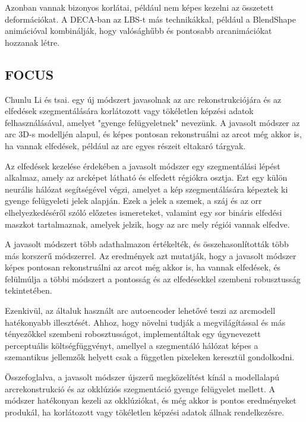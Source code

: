 \documentclass[12pt,a4]{article}
\begin{document}
                Azonban vannak bizonyos korlátai, például nem képes kezelni az összetett deformációkat. A DECA-ban az LBS-t más technikákkal, például a 
                BlendShape animációval kombinálják, hogy valósághűbb és pontosabb arcanimációkat hozzanak létre.

        \subsection{FOCUS}

            \cite{focus}Chunlu Li és tsai. egy új módszert javasolnak az arc rekonstrukciójára és az elfedések szegmentálására korlátozott vagy tökéletlen képzési adatok felhasználásával, amelyet "gyenge felügyeletnek" nevezünk. A javasolt módszer az arc 3D-s modelljén alapul, és képes pontosan rekonstruálni az arcot még akkor is, ha vannak elfedések, például az arc egyes részeit eltakaró tárgyak.
    
            Az elfedések kezelése érdekében a javasolt módszer egy szegmentálási lépést alkalmaz, amely az arcképet látható és elfedett régiókra osztja. Ezt egy külön neurális hálózat segítségével végzi, amelyet a kép szegmentálására képeztek ki gyenge felügyeleti jelek alapján. Ezek a jelek a szemek, a száj és az orr elhelyezkedéséről szóló előzetes ismereteket, valamint egy sor bináris elfedési maszkot tartalmaznak, amelyek jelzik, hogy az arc mely régiói vannak elfedve.
    
            A javasolt módszert több adathalmazon értékelték, és összehasonlították több más korszerű módszerrel. Az eredmények azt mutatják, hogy a javasolt módszer képes pontosan rekonstruálni az arcot még akkor is, ha vannak elfedések, és felülmúlja a többi módszert a pontosság és az elfedésekkel szembeni robusztusság tekintetében.
    
            Ezenkivül, az általuk használt arc autoencoder lehetővé teszi az arcmodell hatékonyabb illesztését. Ahhoz, hogy növelni tudják a megvilágítással és
     	      más tényezőkkel szembeni robosztusságot, implementáltak egy úgynevezett
     	      perceptuális költségfüggvényt, amellyel a szegmentáló hálózat képes a 
            szemantikus jellemzők helyett csak a független pixeleken keresztül gondolkodni.
    
            Összefoglalva, a javasolt módszer újszerű megközelítést kínál a modellalapú arcrekonstrukció és az okklúziós szegmentáció gyenge felügyelet mellett. A módszer hatékonyan kezeli az okklúziókat, és még akkor is pontos eredményeket produkál, ha korlátozott vagy tökéletlen képzési adatok állnak rendelkezésre.
\end{document}
